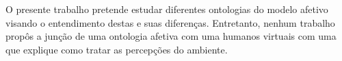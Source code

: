 O presente trabalho pretende estudar diferentes ontologias do modelo afetivo
\cite{benta2007ontology,wks2008towards,springerlink:10.1007/978-3-642-01639-448,lera2009semantic}
visando o entendimento destas e suas diferenças. Entretanto, nenhum trabalho propôs
a junção de uma ontologia afetiva com uma humanos virtuais
\cite{Rojas:2006:IRM:1174429.1174442,Gutierrez:2007:OVH:1229160.1229164} com
uma que explique como tratar as percepções do ambiente.

